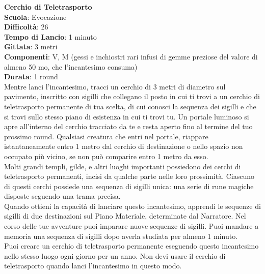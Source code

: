 \begin{multicols}{2}
\medskip\textbf{Cerchio di Teletrasporto}\\
\textbf{Scuola}: Evocazione\\
\textbf{Difficoltà}: 26\\
\textbf{Tempo di Lancio}: 1 minuto\\
\textbf{Gittata}: 3 metri\\
\textbf{Componenti}: V, M (gessi e inchiostri rari infusi di gemme preziose del valore di almeno 50 mo, che l'incantesimo consuma)\\
\textbf{Durata}: 1 round\\
Mentre lanci l'incantesimo, tracci un cerchio di 3 metri di diametro sul pavimento, inscritto con sigilli che collegano il posto in cui ti trovi a un cerchio di teletrasporto permanente di tua scelta, di cui conosci la sequenza dei sigilli e che si trovi sullo stesso piano di esistenza in cui ti trovi tu. Un portale luminoso si apre all'interno del cerchio tracciato da te e resta aperto fino al termine del tuo prossimo round. Qualsiasi creatura che entri nel portale, riappare istantaneamente entro 1 metro dal cerchio di destinazione o nello spazio non
occupato più vicino, se non può comparire entro 1 metro da esso.\\
Molti grandi templi, gilde, e altri luoghi importanti possiedono dei cerchi di teletrasporto permanenti, incisi da qualche parte nelle loro prossimità. Ciascuno di questi cerchi possiede una sequenza di sigilli unica: una serie di rune magiche disposte seguendo una trama precisa.\\ Quando ottieni la capacità di lanciare questo incantesimo, apprendi le sequenze di sigilli di
due destinazioni sul Piano Materiale, determinate dal Narratore. Nel corso delle tue avventure puoi imparare nuove sequenze di sigilli. Puoi mandare a memoria una sequenza di sigilli dopo averla studiata per almeno 1 minuto.\\
Puoi creare un cerchio di teletrasporto permanente eseguendo questo incantesimo nello stesso luogo ogni giorno per un anno. Non devi usare il cerchio di teletrasporto quando lanci l'incantesimo in questo modo.


\end{multicols}
